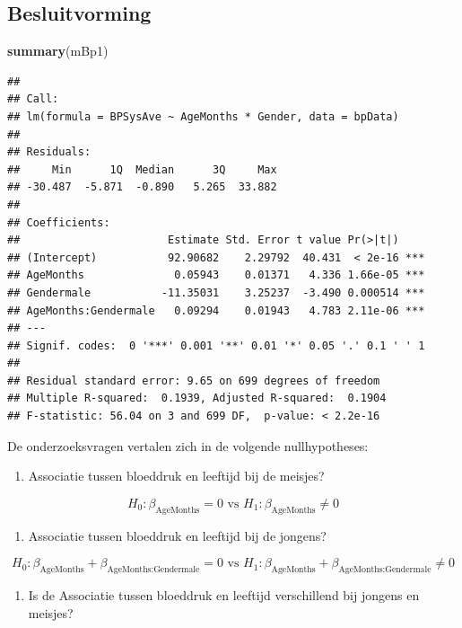 \documentclass[
  12pt,dutch]{book}
\newenvironment{Shaded}{\begin{snugshade}}{\end{snugshade}}
\newcommand{\FunctionTok}[1]{\textcolor[rgb]{0.13,0.29,0.53}{\textbf{#1}}}
\newcommand{\NormalTok}[1]{#1}
\providecommand{\tightlist}{%
  \setlength{\itemsep}{0pt}\setlength{\parskip}{0pt}}
\theoremstyle{definition}
\theoremstyle{definition}
\theoremstyle{definition}
\theoremstyle{definition}
\theoremstyle{remark}
\begin{document}
\subsection{Besluitvorming}\label{besluitvorming}

\begin{Shaded}
\begin{Highlighting}[]
\FunctionTok{summary}\NormalTok{(mBp1)}
\end{Highlighting}
\end{Shaded}

\begin{verbatim}
## 
## Call:
## lm(formula = BPSysAve ~ AgeMonths * Gender, data = bpData)
## 
## Residuals:
##     Min      1Q  Median      3Q     Max 
## -30.487  -5.871  -0.890   5.265  33.882 
## 
## Coefficients:
##                       Estimate Std. Error t value Pr(>|t|)    
## (Intercept)           92.90682    2.29792  40.431  < 2e-16 ***
## AgeMonths              0.05943    0.01371   4.336 1.66e-05 ***
## Gendermale           -11.35031    3.25237  -3.490 0.000514 ***
## AgeMonths:Gendermale   0.09294    0.01943   4.783 2.11e-06 ***
## ---
## Signif. codes:  0 '***' 0.001 '**' 0.01 '*' 0.05 '.' 0.1 ' ' 1
## 
## Residual standard error: 9.65 on 699 degrees of freedom
## Multiple R-squared:  0.1939, Adjusted R-squared:  0.1904 
## F-statistic: 56.04 on 3 and 699 DF,  p-value: < 2.2e-16
\end{verbatim}

De onderzoeksvragen vertalen zich in de volgende nullhypotheses:

\begin{enumerate}
\def\labelenumi{\arabic{enumi}.}
\tightlist
\item
  Associatie tussen bloeddruk en leeftijd bij de meisjes?
\end{enumerate}

\[
H_0: \beta_\text{AgeMonths} = 0 \text{ vs } H_1: \beta_\text{AgeMonths} \neq 0
\]

\begin{enumerate}
\def\labelenumi{\arabic{enumi}.}
\setcounter{enumi}{1}
\tightlist
\item
  Associatie tussen bloeddruk en leeftijd bij de jongens?
\end{enumerate}

\[
H_0: \beta_\text{AgeMonths} + \beta_\text{AgeMonths:Gendermale} = 0 \text{ vs } H_1: \beta_\text{AgeMonths} + \beta_\text{AgeMonths:Gendermale} \neq 0
\]

\begin{enumerate}
\def\labelenumi{\arabic{enumi}.}
\setcounter{enumi}{2}
\tightlist
\item
  Is de Associatie tussen bloeddruk en leeftijd verschillend bij jongens en meisjes?
\end{enumerate}
\end{document}

